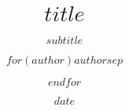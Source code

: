 \title{$title$}
\subtitle{$subtitle$}
\author{$for(author)$$author$$sep$ \and $endfor$}
\date{$date$}

